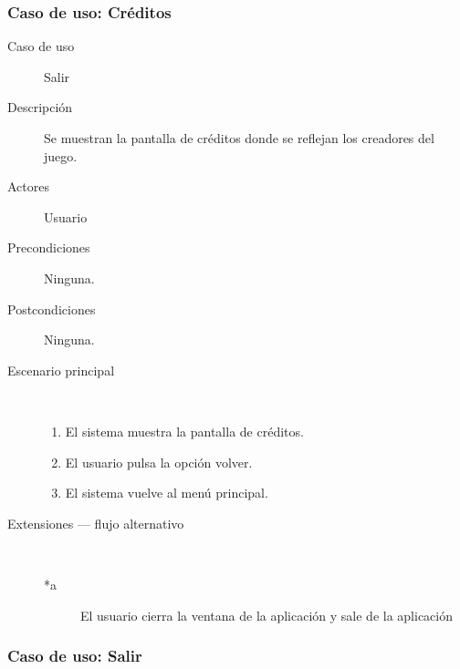 \begin{description}
\begin{description}
            
        \end{description}
\end{description}

\subsubsection{Caso de uso: Créditos}

\begin{description}
    \item[Caso de uso] Salir
    \item[Descripción] Se muestran la pantalla de créditos donde se reflejan los creadores del juego.
    \item[Actores] Usuario
    \item[Precondiciones] Ninguna.
    \item[Postcondiciones] Ninguna.
    \item[Escenario principal] $\quad$
        \begin{enumerate}
            \item El sistema muestra la pantalla de créditos.
            \item El usuario pulsa la opción volver.
            \item El sistema vuelve al menú principal.
        \end{enumerate}
    \item[Extensiones --- flujo alternativo] $\quad$
        \begin{description}
            \item[*a ] El usuario cierra la ventana de la aplicación y sale de la aplicación
        \end{description}
\end{description}

\subsubsection{Caso de uso: Salir}

